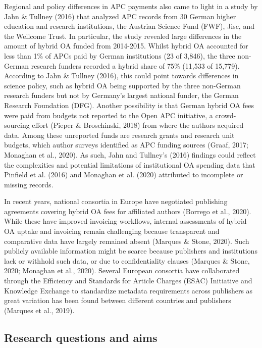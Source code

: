 \documentclass[a4paper,man,floatsintext,longtable,noextraspace,12pt]{apa6}
\begin{document}
Regional and policy differences in APC payments also came to light in a
study by Jahn \& Tullney (2016) that analyzed APC records from 30 German
higher education and research institutions, the Austrian Science Fund
(FWF), Jisc, and the Wellcome Trust. In particular, the study revealed
large differences in the amount of hybrid OA funded from 2014-2015.
Whilst hybrid OA accounted for less than 1\% of APCs paid by German
institutions (23 of 3,846), the three non-German research funders
recorded a hybrid share of 75\% (11,533 of 15,779). According to Jahn \&
Tullney (2016), this could point towards differences in science policy,
such as hybrid OA being supported by the three non-German research
funders but not by Germany's largest national funder, the German
Research Foundation (DFG). Another possibility is that German hybrid OA
fees were paid from budgets not reported to the Open APC initiative, a
crowd-sourcing effort (Pieper \& Broschinski, 2018) from where the
authors acquired data. Among these unreported funds are research grants
and research unit budgets, which author surveys identified as APC
funding sources (Graaf, 2017; Monaghan et al., 2020). As such, Jahn and
Tullney's (2016) findings could reflect the complexities and potential
limitations of institutional OA spending data that Pinfield et al.
(2016) and Monaghan et al. (2020) attributed to incomplete or missing
records.

In recent years, national consortia in Europe have negotiated publishing
agreements covering hybrid OA fees for affiliated authors (Borrego et
al., 2020). While these have improved invoicing workflows, internal
assessments of hybrid OA uptake and invoicing remain challenging because
transparent and comparative data have largely remained absent (Marques
\& Stone, 2020). Such publicly available information might be scarce
because publishers and institutions lack or withhold such data, or due
to confidentiality clauses (Marques \& Stone, 2020; Monaghan et al.,
2020). Several European consortia have collaborated through the
Efficiency and Standards for Article Charges (ESAC) Initiative and
Knowledge Exchange to standardize metadata requirements across
publishers as great variation has been found between different countries
and publishers (Marques et al., 2019).

\hypertarget{research-questions-and-aims}{%
\subsection{Research questions and
aims}\label{research-questions-and-aims}}
\end{document}
